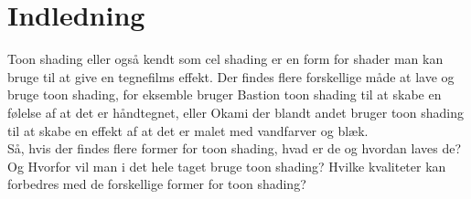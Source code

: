 \section*{Indledning}
\thispagestyle{empty}
Toon shading eller også kendt som cel shading er en form for shader man kan bruge til at give en tegnefilms effekt. Der findes flere forskellige måde at lave og bruge toon shading, for eksemble bruger Bastion toon shading til at skabe en følelse af at det er håndtegnet, eller Okami der blandt andet bruger toon shading til at skabe en effekt af at det er malet med vandfarver og blæk.
\\
Så, hvis der findes flere former for toon shading, hvad er de og hvordan laves de? Og Hvorfor vil man i det hele taget bruge toon shading? Hvilke kvaliteter kan forbedres med de forskellige former for toon shading?